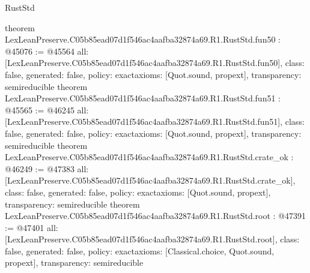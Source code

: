 \begin{lexlean}{RustStd}
\begin{coremodule}
{}
theorem LexLeanPreserve.C05b85ead07d1f546ac4aafba32874a69.R1.RustStd.fun50 : @45076 := @45564 {
  all: [LexLeanPreserve.C05b85ead07d1f546ac4aafba32874a69.R1.RustStd.fun50],
  class: false,
  generated: false,
  policy: exact{axioms: [Quot.sound, propext]},
  transparency: semireducible
}
theorem LexLeanPreserve.C05b85ead07d1f546ac4aafba32874a69.R1.RustStd.fun51 : @45565 := @46245 {
  all: [LexLeanPreserve.C05b85ead07d1f546ac4aafba32874a69.R1.RustStd.fun51],
  class: false,
  generated: false,
  policy: exact{axioms: [Quot.sound, propext]},
  transparency: semireducible
}
theorem LexLeanPreserve.C05b85ead07d1f546ac4aafba32874a69.R1.RustStd.crate_ok : @46249 := @47383 {
  all: [LexLeanPreserve.C05b85ead07d1f546ac4aafba32874a69.R1.RustStd.crate_ok],
  class: false,
  generated: false,
  policy: exact{axioms: [Quot.sound, propext]},
  transparency: semireducible
}
theorem LexLeanPreserve.C05b85ead07d1f546ac4aafba32874a69.R1.RustStd.root : @47391 := @47401 {
  all: [LexLeanPreserve.C05b85ead07d1f546ac4aafba32874a69.R1.RustStd.root],
  class: false,
  generated: false,
  policy: exact{axioms: [Classical.choice, Quot.sound, propext]},
  transparency: semireducible
}


\end{coremodule}
\end{lexlean}
